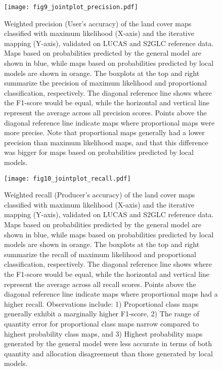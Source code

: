     \begin{figure}[H]
        \centering
        \texttt{[image: fig9\_jointplot\_precision.pdf]}
        \caption{Weighted precision (User's accuracy) of the land cover maps classified with maximum likelihood (X-axis) and the iterative mapping (Y-axis), validated on LUCAS and S2GLC reference data. Maps based on probabilities predicted by the general model are shown in blue, while maps based on probabilities predicted by local models are shown in orange. The boxplots at the top and right summarize the precision of maximum likelihood and proportional classification, respectively. The diagonal reference line shows where the F1-score would be equal, while the horizontal and vertical line represent the average across all precision scores. Points above the diagonal reference line indicate maps where proportional maps were more precise. 
        Note that proportional maps generally had a lower precision than maximum likelihood maps, and that this difference was bigger for maps based on probabilities predicted by local models.}
        \label{fig:precision}
    \end{figure}

    \begin{figure}[H]
        \centering
        \texttt{[image: fig10\_jointplot\_recall.pdf]}
        \caption{Weighted recall (Producer's accuracy) of the land cover maps classified with maximum likelihood (X-axis) and the iterative mapping (Y-axis), validated on LUCAS and S2GLC reference data. Maps based on probabilities predicted by the general model are shown in blue, while maps based on probabilities predicted by local models are shown in orange. The boxplots at the top and right summarize the recall of maximum likelihood and proportional classification, respectively. The diagonal reference line shows where the F1-score would be equal, while the horizontal and vertical line represent the average across all recall scores. Points above the diagonal reference line indicate maps where proportional maps had a higher recall. 
        Observations include: 1) Proportional class maps generally exhibit a marginally higher F1-score, 2) The range of quantity error for proportional class maps narrow compared to highest probability class maps, and 3) Highest probability maps generated by the general model were less accurate in terms of both quantity and allocation disagreement than those generated by local models.}
        \label{fig:recall}
    \end{figure}


